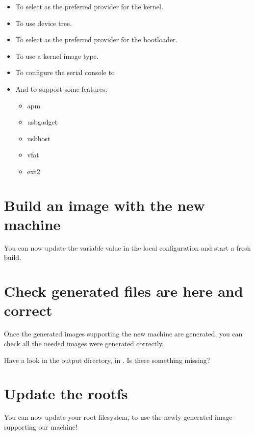 \begin{itemize}
  \item To select  as the preferred provider
    for the kernel.
  \item To use  device tree.
  \item To select  as the preferred provider
    for the bootloader.
  \item To use a  kernel image type.
  \item To configure the serial console to 
  \item And to support some features:
    \begin{itemize}
      \item apm
      \item usbgadget
      \item usbhost
      \item vfat
      \item ext2
    \end{itemize}
\end{itemize}

\section{Build an image with the new machine}

You can now update the  variable value in the local configuration
and start a fresh build.

\section{Check generated files are here and correct}

Once the generated images supporting the new  machine are
generated, you can check all the needed images were generated
correctly.

Have a look in the output directory, in
. Is there something
missing?

\section{Update the rootfs}

You can now update your root filesystem, to use the newly
generated image supporting our  machine!
